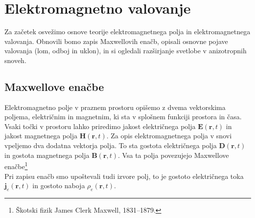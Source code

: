 
\chapter{Elektromagnetno valovanje}
Za začetek osvežimo osnove teorije elektromagnetnega polja in elektromagnetnega valovanja. 
Obnovili bomo zapis Maxwellovih enačb, opisali osnovne pojave valovanja (lom, odboj in uklon),
in si ogledali razširjanje svetlobe v anizotropnih snoveh. 

\section{Maxwellove enačbe}
Elektromagnetno polje v praznem prostoru opišemo z dvema vektorskima
poljema, električnim in magnetnim, ki sta v splošnem funkciji prostora
in časa. Vsaki točki v prostoru lahko priredimo jakost
električnega polja $\mathbf{E}(\mathbf{r},t)$ in jakost
magnetnega polja $\mathbf{H}(\mathbf{r},t)$. Za opis elektromagnetnega
polja v snovi vpeljemo dva dodatna vektorja polja. To sta gostota
električnega polja $\mathbf{D}(\mathbf{r},t)$ in gostota magnetnega
polja $\mathbf{B}(\mathbf{r},t)$.
Vsa ta polja povezujejo Maxwellove enačbe\footnote{
Škotski fizik James Clerk Maxwell, 1831--1879.}
\\
Pri zapisu enačb smo upoštevali tudi izvore polj, to je gostoto
električnega toka $\mathbf{j}_e(\mathbf{r},t)$ in gostoto naboja $\rho_{e}(\mathbf{r},t)$. 

